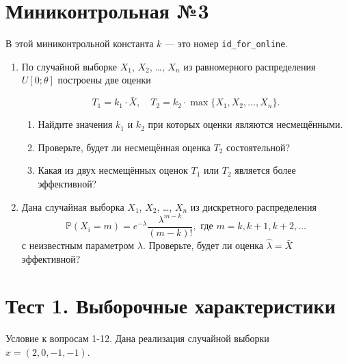 \documentclass[12pt]{article}
\def \P{\mathbb{P}}
\begin{document}
\section*{Миниконтрольная №3}

В этой миниконтрольной константа $k$ — это номер \verb|id_for_online|.

\begin{enumerate}
\item По случайной выборке $X_1$, $X_2$, \ldots, $X_n$ из равномерного распределения $U[0; \theta]$ построены две оценки

\[
T_1 = k_1 \cdot \bar X, \quad T_2 = k_2 \cdot \max\{X_1, X_2, \ldots, X_n \}.
\]

\begin{enumerate}
\item Найдите значения $k_1$ и $k_2$ при которых оценки являются несмещёнными.
\item Проверьте, будет ли несмещённая оценка $T_2$ состоятельной?
\item Какая из двух несмещённых оценок $T_1$ или $T_2$ является более эффективной?
\end{enumerate}
\item Дана случайная выборка $X_1$, $X_2$, \ldots, $X_n$ из дискретного распределения
\[
\P(X_i = m) = e^{-\lambda} \frac{\lambda^{m-k}}{(m-k)!}, \text{ где } m = k, k+1, k+2, \ldots
\]
с неизвестным параметром $\lambda$. Проверьте, будет ли оценка $\hat\lambda = \bar X$ эффективной?

\end{enumerate}

\newpage
\section*{Тест 1.  Выборочные характеристики}

Условие к вопросам 1-12. Дана реализация случайной выборки $x = (2, 0, -1, -1)$. 
\end{document}
